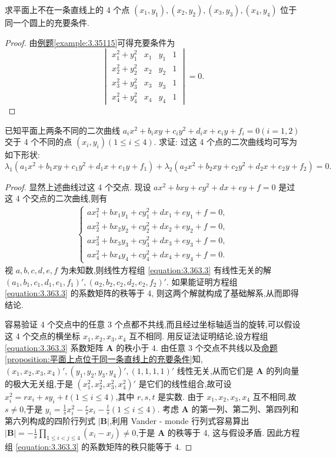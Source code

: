 \documentclass[lang=cn,newtx,10pt,scheme=chinese]{elegantbook}
\begin{document}
\begin{proposition}\label{proposition:平面上4点共圆的充要条件}
求平面上不在一条直线上的 4 个点 \((x_1,y_1),(x_2,y_2),(x_3,y_3),(x_4,y_4)\) 位于同一个圆上的充要条件.
\end{proposition}
\begin{proof}
由\hyperref[example:3.35115]{例题\ref{example:3.35115}}可得充要条件为
\[
\begin{vmatrix}
x_1^2 + y_1^2&x_1&y_1&1\\
x_2^2 + y_2^2&x_2&y_2&1\\
x_3^2 + y_3^2&x_3&y_3&1\\
x_4^2 + y_4^2&x_4&y_4&1
\end{vmatrix}=0.
\]
\end{proof}

\begin{example}
已知平面上两条不同的二次曲线 \(a_ix^2 + b_ixy + c_iy^2 + d_ix + e_iy + f_i = 0(i = 1,2)\) 交于 4 个不同的点 \((x_i,y_i)(1\leq i\leq 4)\). 求证: 过这 4 个点的二次曲线均可写为如下形状:
\[
\lambda_1(a_1x^2 + b_1xy + c_1y^2 + d_1x + e_1y + f_1)+\lambda_2(a_2x^2 + b_2xy + c_2y^2 + d_2x + e_2y + f_2)=0.
\]
\end{example}
\begin{proof}
显然上述曲线过这 4 个交点. 现设 \(ax^2 + bxy + cy^2 + dx + ey + f = 0\) 是过这 4 个交点的二次曲线,则有
\begin{align}\label{equation:3.363.3}
\begin{cases}
ax_1^2 + bx_1y_1 + cy_1^2 + dx_1 + ey_1 + f = 0,\\
ax_2^2 + bx_2y_2 + cy_2^2 + dx_2 + ey_2 + f = 0,\\
ax_3^2 + bx_3y_3 + cy_3^2 + dx_3 + ey_3 + f = 0,\\
ax_4^2 + bx_4y_4 + cy_4^2 + dx_4 + ey_4 + f = 0.
\end{cases}
\end{align}
视 \(a,b,c,d,e,f\) 为未知数,则线性方程组 \eqref{equation:3.363.3} 有线性无关的解 \((a_1,b_1,c_1,d_1,e_1,f_1)',(a_2,b_2,c_2,d_2,e_2,f_2)'\). 如果能证明方程组 \eqref{equation:3.363.3} 的系数矩阵的秩等于 4, 则这两个解就构成了基础解系,从而即得结论.

容易验证 4 个交点中的任意 3 个点都不共线,而且经过坐标轴适当的旋转,可以假设这 4 个交点的横坐标 \(x_1,x_2,x_3,x_4\) 互不相同. 用反证法证明结论,设方程组 \eqref{equation:3.363.3} 系数矩阵 \(\boldsymbol{A}\) 的秩小于 4. 由任意 3 个交点不共线以及\hyperref[proposition:平面上点位于同一条直线上的充要条件]{命题\ref{proposition:平面上点位于同一条直线上的充要条件}}知,\((x_1,x_2,x_3,x_4)',(y_1,y_2,y_3,y_4)',(1,1,1,1)'\) 线性无关,从而它们是 \(\boldsymbol{A}\) 的列向量的极大无关组,于是 \((x_1^2,x_2^2,x_3^2,x_4^2)'\) 是它们的线性组合,故可设 \(x_i^2 = rx_i + sy_i + t(1\leq i\leq 4)\),其中 \(r,s,t\) 是实数. 由于 \(x_1,x_2,x_3,x_4\) 互不相同,故 \(s\neq 0\),于是 \(y_i = \frac{1}{s}x_i^2 - \frac{r}{s}x_i - \frac{t}{s}(1\leq i\leq 4)\). 考虑 \(\boldsymbol{A}\) 的第一列、第二列、第四列和第六列构成的四阶行列式 \(|\boldsymbol{B}|\),利用 Vander - monde 行列式容易算出 \(|\boldsymbol{B}|=-\frac{1}{s}\prod_{1\leq i < j\leq 4}(x_i - x_j)\neq 0\),于是 \(\boldsymbol{A}\) 的秩等于 4, 这与假设矛盾. 因此方程组 \eqref{equation:3.363.3} 的系数矩阵的秩只能等于 4.
\end{proof}
\end{document}
